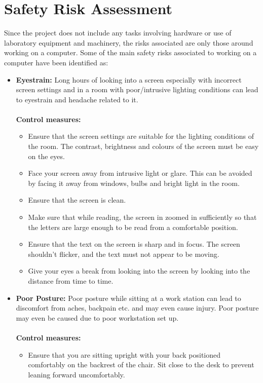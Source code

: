 \documentclass[a4paper,12pt]{report}
\begin{document}
\section{Safety Risk Assessment}
Since the project does not include any tasks involving hardware or use of laboratory equipment and machinery, the risks associated are only those around working on a computer. Some of the main safety risks associated to working on a computer have been identified as:
\begin{itemize}
	\item  	\textbf{Eyestrain:}  Long hours of looking into a screen especially with incorrect screen settings and in a room with poor/intrusive lighting conditions can lead to eyestrain and headache related to it. \\ \\
	\textbf{Control measures:}
	\begin{itemize}
		\item Ensure that the screen settings are suitable for the lighting conditions of the room. The contrast, brightness and colours of the screen must be easy on the eyes.
		\item Face your screen away from intrusive light or glare. This can be avoided by facing it away from windows, bulbs and bright light in the room.
		\item Ensure that the screen is clean.
		\item Make sure that while reading, the screen in zoomed in sufficiently so that the letters are large enough to be read from a comfortable position.
		\item Ensure that the text on the screen is sharp and in focus. The screen shouldn’t flicker, and the text must not appear to be moving.
		\item Give your eyes a break from looking into the screen by looking into the distance from time to time.
	\end{itemize}
	\item \textbf{Poor Posture:} Poor posture while sitting at a work station can lead to discomfort from aches, backpain etc. and may even cause injury. Poor posture may even be caused due to poor workstation set up.\\ \\
	\textbf{Control measures:}
	\begin{itemize}
		\item Ensure that you are sitting upright with your back positioned comfortably on the backrest of the chair. Sit close to the desk to prevent leaning forward uncomfortably.

\end{itemize}
\end{itemize}
\end{document}
